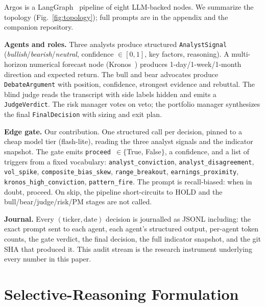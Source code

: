 \documentclass[conference]{IEEEtran}
\begin{document}
Argos is a LangGraph~\cite{langgraph} pipeline of eight LLM-backed
nodes. We summarize the topology (Fig.~\ref{fig:topology}); full
prompts are in the appendix and the companion repository.

\textbf{Agents and roles.}
Three analysts produce structured \texttt{AnalystSignal}
(\textit{bullish}/\textit{bearish}/\textit{neutral}, confidence
$\in[0,1]$, key factors, reasoning). A multi-horizon numerical
forecast node (Kronos~\cite{kronos}) produces 1-day/1-week/1-month
direction and expected return. The bull and bear advocates produce
\texttt{DebateArgument} with position, confidence, strongest evidence
and rebuttal. The blind judge reads the transcript with side labels
hidden and emits a \texttt{JudgeVerdict}. The risk manager votes on
veto; the portfolio manager synthesizes the final
\texttt{FinalDecision} with sizing and exit plan.

\textbf{Edge gate.}
Our contribution. One structured call per decision, pinned to a cheap
model tier (flash-lite), reading the three analyst signals and the
indicator snapshot. The gate emits \texttt{proceed}~$\in\{$True,
False$\}$, a confidence, and a list of triggers from a fixed
vocabulary: \texttt{analyst\_conviction},
\texttt{analyst\_disagreement}, \texttt{vol\_spike},
\texttt{composite\_bias\_skew}, \texttt{range\_breakout},
\texttt{earnings\_proximity}, \texttt{kronos\_high\_conviction},
\texttt{pattern\_fire}. The prompt is recall-biased: when in doubt,
proceed. On skip, the pipeline short-circuits to HOLD and the
bull/bear/judge/risk/PM stages are not called.

\textbf{Journal.}
Every $(\text{ticker}, \text{date})$ decision is journalled as JSONL
including: the exact prompt sent to each agent, each agent's
structured output, per-agent token counts, the gate verdict, the
final decision, the full indicator snapshot, and the git SHA that
produced it. This audit stream is the research instrument underlying
every number in this paper.

\section{Selective-Reasoning Formulation}
\label{sec:formulation}
\end{document}
